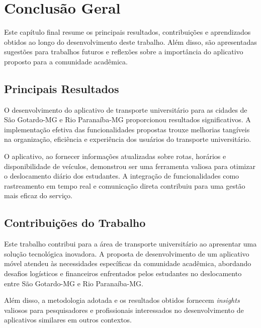 \documentclass[
    12pt,                   %
    openright,              %
    oneside,                %
    a4paper,                %
    sumario=tradicional,    %
    english,                %
    brazil,                 %
    ]{abntex2}
\begin{document}
    
    
\chapter{Conclusão Geral}

\label{chap:conclusao}

Este capítulo final resume os principais resultados, contribuições e aprendizados obtidos ao longo do desenvolvimento deste trabalho. Além disso, são apresentadas sugestões para trabalhos futuros e reflexões sobre a importância do aplicativo proposto para a comunidade acadêmica.

\section{Principais Resultados}

O desenvolvimento do aplicativo de transporte universitário para as cidades de São Gotardo-MG e Rio Paranaíba-MG proporcionou resultados significativos. A implementação efetiva das funcionalidades propostas trouxe melhorias tangíveis na organização, eficiência e experiência dos usuários do transporte universitário.

O aplicativo, ao fornecer informações atualizadas sobre rotas, horários e disponibilidade de veículos, demonstrou ser uma ferramenta valiosa para otimizar o deslocamento diário dos estudantes. A integração de funcionalidades como rastreamento em tempo real e comunicação direta contribuiu para uma gestão mais eficaz do serviço.

\section{Contribuições do Trabalho}

Este trabalho contribui para a área de transporte universitário ao apresentar uma solução tecnológica inovadora. A proposta de desenvolvimento de um aplicativo móvel atendeu às necessidades específicas da comunidade acadêmica, abordando desafios logísticos e financeiros enfrentados pelos estudantes no deslocamento entre São Gotardo-MG e Rio Paranaíba-MG.

Além disso, a metodologia adotada e os resultados obtidos fornecem \textit{insights} valiosos para pesquisadores e profissionais interessados no desenvolvimento de aplicativos similares em outros contextos.
\end{document}
